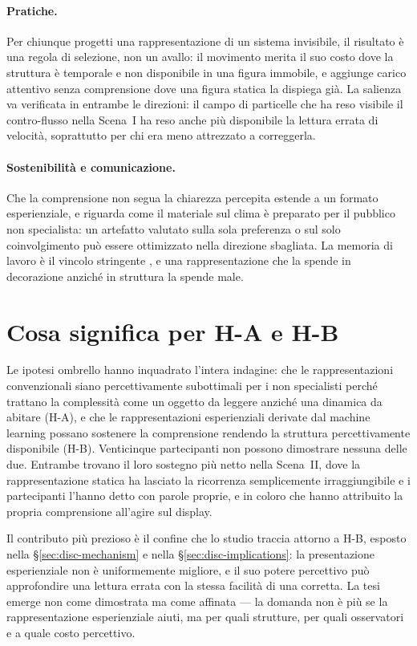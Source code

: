 \paragraph{Pratiche.} Per chiunque progetti una rappresentazione di un sistema invisibile, il risultato è una regola di selezione, non un avallo: il movimento merita il suo costo dove la struttura è temporale e non disponibile in una figura immobile, e aggiunge carico attentivo senza comprensione dove una figura statica la dispiega già. La salienza va verificata in entrambe le direzioni: il campo di particelle che ha reso visibile il contro-flusso nella Scena~I ha reso anche più disponibile la lettura errata di velocità, soprattutto per chi era meno attrezzato a correggerla.

\paragraph{Sostenibilità e comunicazione.} Che la comprensione non segua la chiarezza percepita estende \textcite{hegarty2012} a un formato esperienziale, e riguarda come il materiale sul clima è preparato per il pubblico non specialista: un artefatto valutato sulla sola preferenza o sul solo coinvolgimento può essere ottimizzato nella direzione sbagliata. La memoria di lavoro è il vincolo stringente \parencite{sweller1988}, e una rappresentazione che la spende in decorazione anziché in struttura la spende male.

\section{Cosa significa per H-A e H-B}
\label{sec:disc-umbrella}

Le ipotesi ombrello hanno inquadrato l'intera indagine: che le rappresentazioni convenzionali siano percettivamente subottimali per i non specialisti perché trattano la complessità come un oggetto da leggere anziché una dinamica da abitare (H-A), e che le rappresentazioni esperienziali derivate dal machine learning possano sostenere la comprensione rendendo la struttura percettivamente disponibile (H-B). Venticinque partecipanti non possono dimostrare nessuna delle due. Entrambe trovano il loro sostegno più netto nella Scena~II, dove la rappresentazione statica ha lasciato la ricorrenza semplicemente irraggiungibile e i partecipanti l'hanno detto con parole proprie, e in coloro che hanno attribuito la propria comprensione all'agire sul display.

Il contributo più prezioso è il confine che lo studio traccia attorno a H-B, esposto nella \S\ref{sec:disc-mechanism} e nella \S\ref{sec:disc-implications}: la presentazione esperienziale non è uniformemente migliore, e il suo potere percettivo può approfondire una lettura errata con la stessa facilità di una corretta. La tesi emerge non come dimostrata ma come affinata --- la domanda non è più se la rappresentazione esperienziale aiuti, ma per quali strutture, per quali osservatori e a quale costo percettivo.

